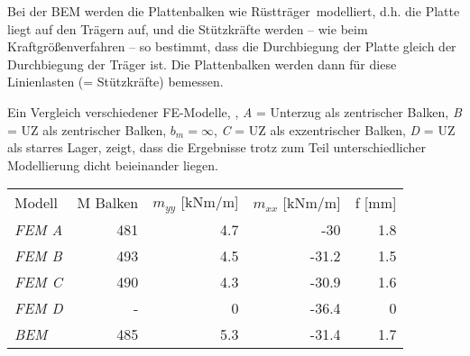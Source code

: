 Bei der BEM werden die Plattenbalken wie \glq R\"{u}sttr\"{a}ger\grq\ modelliert, d.h. die Platte liegt auf den Tr\"{a}gern auf, und die St\"{u}tzkr\"{a}fte werden -- wie beim Kraftgr\"{o}{\ss}enverfahren -- so bestimmt, dass die Durchbiegung der Platte gleich der Durchbiegung der Tr\"{a}ger ist. Die Plattenbalken werden dann f\"{u}r diese Linienlasten (= St\"{u}tzkr\"{a}fte) bemessen.

Ein Vergleich verschiedener FE-Modelle, \cite{Werkle}, {\em A\/} = Unterzug als zentrischer Balken, {\em B\/} = UZ als zentrischer Balken, $b_m = \infty$, {\em C\/} = UZ als exzentrischer Balken, {\em D\/} = UZ als starres Lager, zeigt, dass die Ergebnisse trotz zum Teil unterschiedlicher Modellierung dicht beieinander liegen.\\

\begin{tabular}{lrrrr}
\noalign{\hrule\smallskip}
    Modell &   M Balken & $m_{yy}$ [kNm/m] & $m_{xx}$ [kNm/m] &     f [mm] \\
\noalign{\hrule\smallskip}
  {\em   FEM A\/} &        481 &        4.7 &        -30 &        1.8 \\
  {\em    FEM B\/} &        493 &        4.5 &      -31.2 &        1.5 \\
  {\em    FEM C\/} &        490 &        4.3 &      -30.9 &        1.6 \\
  {\em    FEM D\/} &          - &          0 &      -36.4 &          0 \\
  {\em    BEM \/}&        485 &        5.3 &     -31.4 &       1.7
\end{tabular}\\

